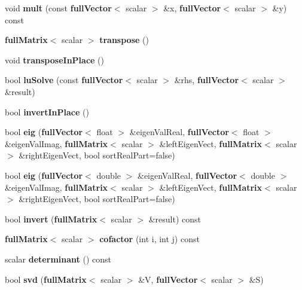 \begin{DoxyCompactItemize}
\item 
void {\bfseries mult} (const {\bf full\-Vector}$<$ scalar $>$ \&x, {\bf full\-Vector}$<$ scalar $>$ \&y) const \label{classfullMatrix_a92754f8e604d7ba8cc5ab637bfd7b023}

\item 
{\bf full\-Matrix}$<$ scalar $>$ {\bfseries transpose} ()\label{classfullMatrix_ad054bfb33c419783296ae22e03543a18}

\item 
void {\bfseries transpose\-In\-Place} ()\label{classfullMatrix_abf6486cc39ac0ce4b665ed4d5eb5172d}

\item 
bool {\bfseries lu\-Solve} (const {\bf full\-Vector}$<$ scalar $>$ \&rhs, {\bf full\-Vector}$<$ scalar $>$ \&result)\label{classfullMatrix_a7482094d84f8fb50b07860acd9a97923}

\item 
bool {\bfseries invert\-In\-Place} ()\label{classfullMatrix_acfb82d4d02773c86fad5407dd0409e43}

\item 
bool {\bfseries eig} ({\bf full\-Vector}$<$ float $>$ \&eigen\-Val\-Real, {\bf full\-Vector}$<$ float $>$ \&eigen\-Val\-Imag, {\bf full\-Matrix}$<$ scalar $>$ \&left\-Eigen\-Vect, {\bf full\-Matrix}$<$ scalar $>$ \&right\-Eigen\-Vect, bool sort\-Real\-Part=false)\label{classfullMatrix_ac9513f74358e05a9272a312dc87d7e5f}

\item 
bool {\bfseries eig} ({\bf full\-Vector}$<$ double $>$ \&eigen\-Val\-Real, {\bf full\-Vector}$<$ double $>$ \&eigen\-Val\-Imag, {\bf full\-Matrix}$<$ scalar $>$ \&left\-Eigen\-Vect, {\bf full\-Matrix}$<$ scalar $>$ \&right\-Eigen\-Vect, bool sort\-Real\-Part=false)\label{classfullMatrix_abffb631cd1bbb7d9b71d5fb2bd8a2b6a}

\item 
bool {\bfseries invert} ({\bf full\-Matrix}$<$ scalar $>$ \&result) const \label{classfullMatrix_a7947ac086f8d4d40b39b5c347ab0da25}

\item 
{\bf full\-Matrix}$<$ scalar $>$ {\bfseries cofactor} (int i, int j) const \label{classfullMatrix_ae6c9932625abd474fc469fc4ed49b51d}

\item 
scalar {\bfseries determinant} () const \label{classfullMatrix_a7d28a282ddfca1adb3be76399680d6e1}

\item 
bool {\bfseries svd} ({\bf full\-Matrix}$<$ scalar $>$ \&V, {\bf full\-Vector}$<$ scalar $>$ \&S)\label{classfullMatrix_ae547e42692f3302cd54555e6ec42e8a0}


\end{DoxyCompactItemize}
